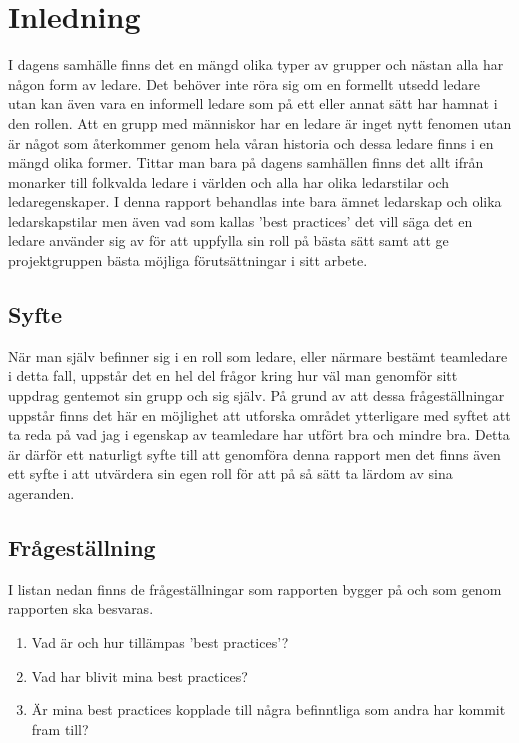\section{Inledning}
I dagens samhälle finns det en mängd olika typer av grupper och nästan alla har någon form av ledare. Det behöver inte röra sig om en formellt utsedd ledare utan kan även vara en informell ledare som på ett eller annat sätt har hamnat i den rollen. Att en grupp med människor har en ledare är inget nytt fenomen utan är något som återkommer genom hela våran historia och dessa ledare finns i en mängd olika former. Tittar man bara på dagens samhällen finns det allt ifrån monarker till folkvalda ledare i världen och alla har olika ledarstilar och ledaregenskaper. I denna rapport behandlas inte bara ämnet ledarskap och olika ledarskapstilar men även vad som kallas 'best practices' det vill säga det en ledare använder sig av för att uppfylla sin roll på bästa sätt samt att ge projektgruppen bästa möjliga förutsättningar i sitt arbete. 

\subsection{Syfte}
När man själv befinner sig i en roll som ledare, eller närmare bestämt teamledare i detta fall, uppstår det en hel del frågor kring hur väl man genomför sitt uppdrag gentemot sin grupp och sig själv. På grund av att dessa frågeställningar uppstår finns det här en möjlighet att utforska området ytterligare med syftet att ta reda på vad jag i egenskap av teamledare har utfört bra och mindre bra. Detta är därför ett naturligt syfte till att genomföra denna rapport men det finns även ett syfte i att utvärdera sin egen roll för att på så sätt ta lärdom av sina ageranden.

\subsection{Frågeställning}
I listan nedan finns de frågeställningar som rapporten bygger på och som genom rapporten ska besvaras.
	\begin{enumerate}
		\item Vad är och hur tillämpas 'best practices'?
		\item Vad har blivit mina best practices?
		\item Är mina best practices kopplade till några befinntliga som andra har kommit fram till?
	\end{enumerate}

